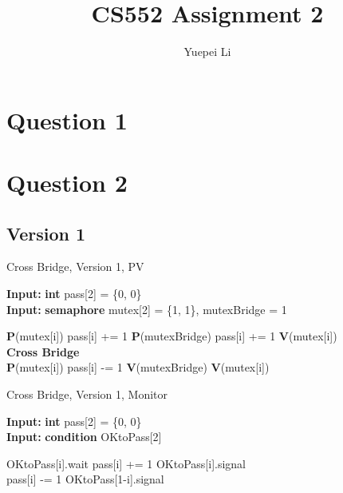 \documentclass{article}
\title{CS552 Assignment 2}
\author{Yuepei Li}
\renewcommand{\algorithmicrequire}{\textbf{Input: }}
\begin{document}
\maketitle

\section{Question 1}

\section{Question 2}

\subsection{Version 1}

\begin{algorithm}
  \caption{Cross Bridge, Version 1, PV}
  \algorithmicrequire \textbf{int} pass[2] = \{0, 0\} \\
  \algorithmicrequire \textbf{semaphore} mutex[2] = \{1, 1\}, mutexBridge = 1
  \begin{algorithmic}
      \State \textbf{P}(mutex[i])
        \State pass[i] += 1
        \State \textbf{P}(mutexBridge)
      \Else
        \State pass[i] += 1
      \EndIf
      \State \textbf{V}(mutex[i])
      \\
      \State \textbf{Cross Bridge}
      \\
      \State \textbf{P}(mutex[i])
      \State pass[i] -= 1
        \State \textbf{V}(mutexBridge)
      \EndIf
      \State \textbf{V}(mutex[i])
    \EndProcedure
  \end{algorithmic}
\end{algorithm}

\begin{algorithm}
  \caption{Cross Bridge, Version 1, Monitor}
  \algorithmicrequire \textbf{int} pass[2] = \{0, 0\} \\
  \algorithmicrequire \textbf{condition} OKtoPass[2] \\

  \begin{algorithmic}
        \State OKtoPass[i].wait
      \EndIf
      \State pass[i] += 1
      \State OKtoPass[i].signal
    \EndProcedure
    \\
      \State pass[i] -= 1
        \State OKtoPass[1-i].signal
      \EndIf
    \EndProcedure
  \end{algorithmic}
\end{algorithm}
\end{document}
